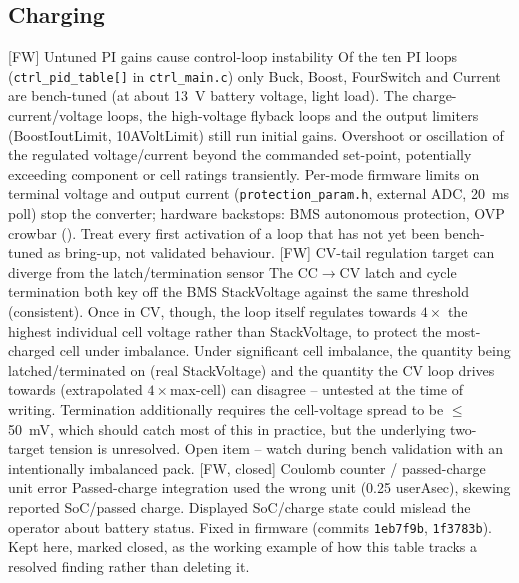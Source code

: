\FloatBarrier

\subsection{Charging}

    \begin{FMEATable}
    \FMEAItemCritical
        {[FW] Untuned PI gains cause control-loop instability}
        {Of the ten PI loops (\texttt{ctrl\_pid\_table[]} in \texttt{ctrl\_main.c}) only Buck, Boost, FourSwitch and Current are bench-tuned (at about \qty{13}{\volt} battery voltage, light load). The charge-current/voltage loops, the high-voltage flyback loops and the output limiters (BoostIoutLimit, 10AVoltLimit) still run initial gains.}
        {Overshoot or oscillation of the regulated voltage/current beyond the commanded set-point, potentially exceeding component or cell ratings transiently.}
        {Per-mode firmware limits on terminal voltage and output current (\texttt{protection\_param.h}, external \ac{ADC}, \qty{20}{\milli\second} poll) stop the converter; hardware backstops: \acs{BMS} autonomous protection, \acs{OVP} crowbar (). Treat every first activation of a loop that has not yet been bench-tuned as bring-up, not validated behaviour.}
    \FMEAItemModerate
        {[FW] CV-tail regulation target can diverge from the latch/termination sensor}
        {The CC$\to$CV latch and cycle termination both key off the \ac{BMS} StackVoltage against the same threshold (consistent). Once in CV, though, the loop itself regulates towards $4 \times$ the highest individual cell voltage rather than StackVoltage, to protect the most-charged cell under imbalance.}
        {Under significant cell imbalance, the quantity being latched/terminated on (real StackVoltage) and the quantity the CV loop drives towards (extrapolated $4\times$max-cell) can disagree -- untested at the time of writing.}
        {Termination additionally requires the cell-voltage spread to be $\leq$\qty{50}{\milli\volt}, which should catch most of this in practice, but the underlying two-target tension is unresolved. Open item -- watch during bench validation with an intentionally imbalanced pack.}
    \FMEAItemMinor
        {[FW, closed] Coulomb counter / passed-charge unit error}
        {Passed-charge integration used the wrong unit (0.25 userAsec), skewing reported \acs{SoC}/passed charge.}
        {Displayed \ac{SoC}/charge state could mislead the operator about battery status.}
        {Fixed in firmware (commits \texttt{1eb7f9b}, \texttt{1f3783b}). Kept here, marked closed, as the working example of how this table tracks a resolved finding rather than deleting it.}

\end{FMEATable}
